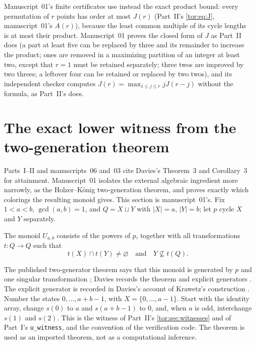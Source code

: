 \documentclass[11pt,a4paper]{article}
\numberwithin{equation}{section}
\theoremstyle{definition}
\theoremstyle{remark}
\begin{document}
Manuscript~01's finite certificates use instead the exact product bound:
every permutation of $r$ points has order at most $J(r)$ (Part~II's
\eqref{tor:eq:J}, manuscript~01's $A(r)$), because the least common multiple
of its cycle lengths is at most their product. Manuscript~01 proves the
closed form of $J$ as Part~II does (a part at least five can be replaced by
three and its remainder to increase the product; ones are removed in a
maximizing partition of an integer at least two, except that $r=1$ must be
retained separately; three twos are improved by two threes; a leftover four
can be retained or replaced by two twos), and its independent checker
computes $J(r)=\max_{1\le j\le r}jJ(r-j)$ without the formula, as Part~II's
does.

\section{The exact lower witness from the two-generation theorem}\label{evo:sec:witness}

Parts~I--II and manuscripts~06 and~03 cite Davies's Theorem~3 and
Corollary~3 for attainment. Manuscript~01 isolates the external algebraic
ingredient more narrowly, as the Holzer--K\"onig two-generation theorem, and
proves exactly which colorings the resulting monoid gives. This section is
manuscript~01's. Fix $1<a<b$, $\gcd(a,b)=1$, and $Q=X\sqcup Y$ with $|X|=a$,
$|Y|=b$; let $p$ cycle $X$ and $Y$ separately.

\begin{definition}\label{evo:et:def:U}
The monoid $U_{a,b}$ consists of the powers of $p$, together with all
transformations $t:Q\to Q$ such that
\[
 t(X)\cap t(Y)\ne\varnothing
 \quad\text{and}\quad Y\not\subseteq t(Q).
\]
\end{definition}

The published two-generator theorem says that this monoid is generated by $p$
and one singular transformation \cite[Theorem~8]{HolzerKoenig2004}; Davies
records the theorem and explicit generators \cite[Section~3]{Davies2017}. The
explicit generator is recorded in Davies's account of Krawetz's construction
\cite{Krawetz2003}. Number the states $0,\ldots,a+b-1$, with
$X=\{0,\ldots,a-1\}$. Start with the identity array, change $s(0)$ to $a$ and
$s(a+b-1)$ to $0$, and, when $a$ is odd, interchange $s(1)$ and $s(2)$. This is
the witness of Part~II's \cref{tor:sec:witnesses} and of Part~I's
\texttt{u\_witness}, and the convention of the verification code. The theorem
is used as an imported theorem, not as a computational inference.
\end{document}
